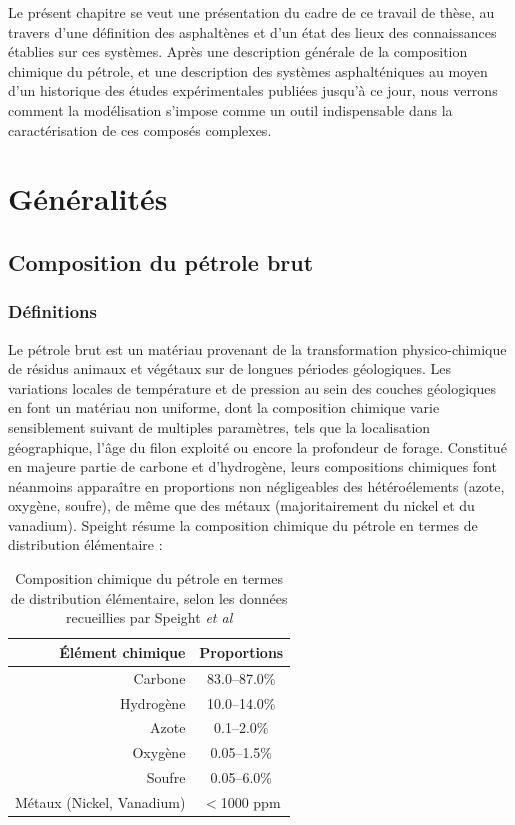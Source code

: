 Le présent chapitre se veut une présentation du cadre de ce travail de thèse, au travers d'une définition des asphaltènes et d'un état des lieux des connaissances établies sur ces systèmes. Après une description générale de la composition chimique du pétrole, et une description des systèmes asphalténiques au moyen d'un historique des études expérimentales publiées jusqu'à ce jour, nous verrons comment la modélisation s'impose comme un outil indispensable dans la caractérisation de ces composés complexes. 




\section{Généralités}

\subsection{Composition du pétrole brut}

\subsubsection{Définitions}

Le pétrole brut est un matériau provenant de la transformation physico-chimique de résidus animaux et végétaux sur de longues périodes géologiques. Les variations locales de température et de pression au sein des couches géologiques en font un matériau non uniforme, dont la composition chimique varie sensiblement suivant de multiples paramètres, tels que la localisation géographique, l'âge du filon exploité ou encore la profondeur de forage. Constitué en majeure partie de carbone et d'hydrogène, leurs compositions chimiques font néanmoins apparaître en proportions non négligeables des hétéroélements (azote, oxygène, soufre), de même que des métaux (majoritairement du nickel et du vanadium). Speight \cite{speight1979some} résume la composition chimique du pétrole en termes de distribution élémentaire : 

\begin{table}[h!]
	\begin{center}
		\begin{tabular}{r|c}
			\hline
			Élément chimique & Proportions \\
			\hline
			Carbone & 83.0--87.0\% \\
			Hydrogène & 10.0--14.0\% \\
			Azote & 0.1--2.0\% \\
			Oxygène & 0.05--1.5\% \\
			Soufre & 0.05--6.0\% \\
			Métaux (Nickel, Vanadium) & $<$1000 ppm \\
			\hline
		\end{tabular}
	\end{center}
	\caption{Composition chimique du pétrole en termes de distribution élémentaire, selon les données recueillies par Speight \textit{et al\cite{speight2004petroleum}}}
	\label{DESpeight}
\end{table}

